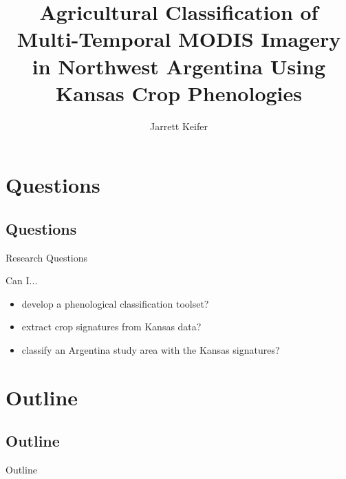 \documentclass[  compress,xcolor={usenames,dvipsnames}]{beamer}
\title{Agricultural Classification of Multi-Temporal MODIS Imagery in Northwest Argentina Using Kansas Crop Phenologies}
\subtitle{}
\date{\formatdate{17}{9}{2014}}
\author{Jarrett Keifer}
\institute{Department of Geography}%
\begin{document}

\maketitle



\section*{Questions}
\subsection*{Questions}

\begin{frame}{Research Questions}

Can I...

\begin{itemize}
  \item<1-> develop a phenological classification toolset?
  \item<2-> extract crop signatures from Kansas data?
  \item<3-> classify an Argentina study area with the Kansas signatures?
\end{itemize}
\end{frame}


\section*{Outline}
\subsection*{Outline}
\begin{frame}{Outline}
  \tableofcontents[hideallsubsections]
\end{frame}


\end{document}
